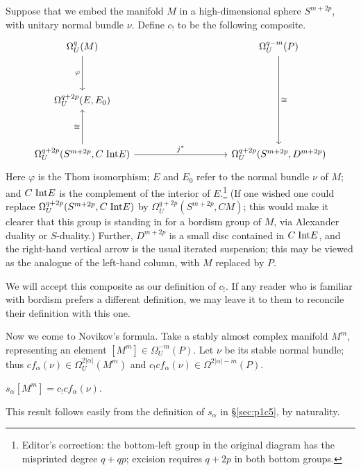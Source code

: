 \documentclass[../main]{subfiles}
\begin{document}
Suppose that we embed the manifold $M$ in a high-dimensional sphere $S^{m+2p}$, with unitary normal bundle $\nu$. Define $c_!$ to be the following composite.
\[
\begin{tikzcd}
\Omega_U^q(M) \arrow[dd, "\varphi"']                                            &  &  &  & \Omega_U^{q-m}(P) \arrow[dddd, "\cong"] \\
                                                                                &  &  &  &                                         \\
{\Omega_U^{q+2p}(E,E_0)}                                                        &  &  &  &                                         \\
                                                                                &  &  &  &                                         \\
{\Omega_U^{q+2p}(S^{m+2p}, C \hspace{0.1cm} \Int E)} \arrow[uu, "\cong"] \arrow[rrrr, "j^*"] &  &  &  & {\Omega_U^{q+2p}(S^{m+2p}, D^{m+2p})}
\end{tikzcd}
\]
Here $\varphi$ is the Thom isomorphism; $E$ and $E_0$ refer to the normal bundle $\nu$ of $M$; and $C \hspace{0.1cm} \mathrm{Int} E$ is the complement of the interior of $E$.\footnote{Editor's correction: the bottom-left group in the original diagram has the misprinted degree $q+qp$; excision requires $q+2p$ in both bottom groups.} (If one wished one could replace $\Omega_U^{q+2p}(S^{m+2p}, C \hspace{0.1cm} \mathrm{Int} E)$ by $\Omega_U^{q+2p}(S^{m+2p}, CM)$; this would make it clearer that this group is standing in for a bordism group of $M$, via Alexander duality or $S$-duality.) Further, $D^{m+2p}$ is a small disc contained in $C \hspace{0.1cm} \mathrm{Int} E$, and the right-hand vertical arrow is the usual iterated suspension; this may be viewed as the analogue of the left-hand column, with $M$ replaced by $P$.

We will accept this composite as our definition of $c_!$. If any reader who is familiar with bordism prefers a different definition, we may leave it to them to reconcile their definition with this one.

Now we come to Novikov's formula. Take a stably almost complex manifold $M^m$, representing an element $[M^m] \in \Omega_U^{-m}(P)$. Let $\nu$ be its stable normal bundle; thus $cf_\alpha(\nu) \in \Omega_U^{2|\alpha|}(M^m)$ and $c_! cf_\alpha(\nu) \in \Omega^{2|\alpha|-m}(P)$.

\begin{thm}[Novikov]\label{thm:p1c08.3}
$s_\alpha[M^m] = c_!cf_\alpha(\nu)$.
\end{thm}
This result follows easily from the definition of $s_\alpha$ in \S\ref{sec:p1c5}, by naturality.
\end{document}
